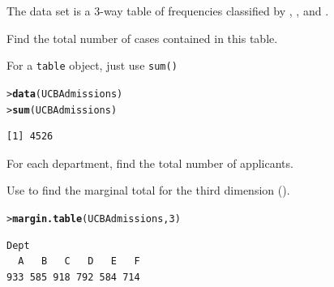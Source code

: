 \documentclass[10pt]{report}\usepackage[]{graphicx}\usepackage[]{color}
\makeatletter
\newcommand{\hlnum}[1]{\textcolor[rgb]{0.686,0.059,0.569}{#1}}%
\newcommand{\hlstd}[1]{\textcolor[rgb]{0.345,0.345,0.345}{#1}}%
\newcommand{\hlkwd}[1]{\textcolor[rgb]{0.737,0.353,0.396}{\textbf{#1}}}%
\newenvironment{kframe}{%
 \def\at@end@of@kframe{}%
 \ifinner\ifhmode%
  \def\at@end@of@kframe{\end{minipage}}%
  \begin{minipage}{\columnwidth}%
 \fi\fi%
 \def\FrameCommand##1{\hskip\@totalleftmargin \hskip-\fboxsep
 \colorbox{shadecolor}{##1}\hskip-\fboxsep
     \hskip-\linewidth \hskip-\@totalleftmargin \hskip\columnwidth}%
 \MakeFramed {\advance\hsize-\width
   \@totalleftmargin\z@ \linewidth\hsize
   \@setminipage}}%
 {\par\unskip\endMakeFramed%
 \at@end@of@kframe}
\newenvironment{knitrout}{}{} %
\renewenvironment{knitrout}{\small\renewcommand{\baselinestretch}{.85}}{} %
\makeatother
\begin{document}
\begin{Exercises}
\exercise The data set  is a 3-way table of frequencies
classified by , , and .
  \begin{enumerate*}
    \item Find the total number of cases contained in this table.
    \begin{ans}
      For a \texttt{table} object, just use \texttt{sum()}
\begin{knitrout}\footnotesize
{}\color{fgcolor}\begin{kframe}
\begin{alltt}
\hlstd{> }\hlkwd{data}\hlstd{(UCBAdmissions)}
\hlstd{> }\hlkwd{sum}\hlstd{(UCBAdmissions)}
\end{alltt}
\begin{verbatim}
[1] 4526
\end{verbatim}
\end{kframe}
\end{knitrout}
    \end{ans}
        
    \item For each department, find the total number of applicants.
    \begin{ans}
      Use  to find the marginal total for the third dimension ().
\begin{knitrout}\footnotesize
{}\color{fgcolor}\begin{kframe}
\begin{alltt}
\hlstd{> }\hlkwd{margin.table}\hlstd{(UCBAdmissions,} \hlnum{3}\hlstd{)}
\end{alltt}
\begin{verbatim}
Dept
  A   B   C   D   E   F 
933 585 918 792 584 714 
\end{verbatim}
\end{kframe}
\end{knitrout}

    \end{ans}
        

\end{enumerate*}
\end{Exercises}
\end{document}
